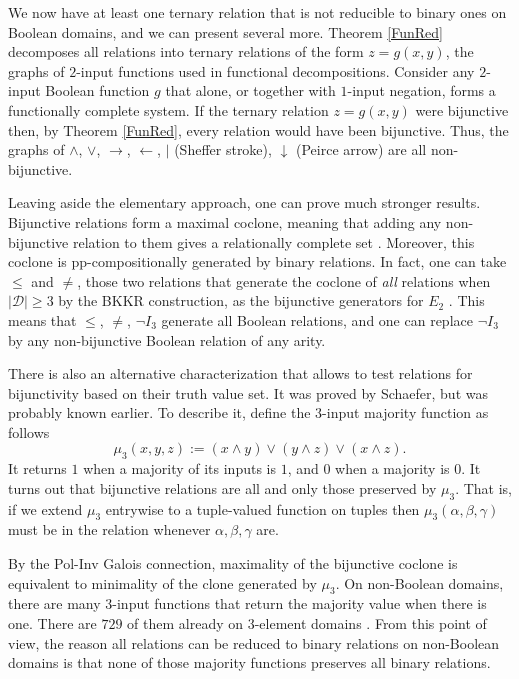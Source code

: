 \documentclass[11pt]{article}
\theoremstyle{plain}
\theoremstyle{definition}
\def\D{\mathcal{D}}
\def\a{\alpha}
\begin{document}
We now have at least one ternary relation that is not reducible to binary ones on Boolean domains, and we can present several more. Theorem \ref{FunRed} decomposes all relations into ternary relations of the form $z=g(x,y)$, the graphs of $2$-input functions used in functional decompositions. Consider any $2$-input Boolean function $g$ that alone, or together with $1$-input negation, forms a functionally complete system. If the ternary relation $z=g(x,y)$ were bijunctive then, by Theorem \ref{FunRed}, every relation would have been bijunctive. Thus, the graphs of $\land$, $\lor$, $\to$, $\leftarrow$, $|$ (Sheffer stroke), $\downarrow$ (Peirce arrow) are all non-bijunctive.

Leaving aside the elementary approach, one can prove much stronger results. Bijunctive relations form a maximal coclone, meaning that adding any non-bijunctive relation to them gives a relationally complete set \cite{BRSV05,CreVol08}. Moreover, this coclone is pp-compositionally generated by binary relations. In fact, one can take $\leq$ and $\neq$, those two relations that generate the coclone of {\it all} relations when $|\D|\geq3$ by the BKKR construction, as the bijunctive generators for $E_2$ \cite{BRSV05}. This means that $\leq$,  $\neq$, $\neg I_3$ generate all Boolean relations, and one can replace $\neg I_3$ by any non-bijunctive Boolean relation of any arity.

There is also an alternative characterization that allows to test relations for bijunctivity based on their truth value set. It was proved by Schaefer, but was probably known earlier. To describe it, define the $3$-input majority function as follows\begin{equation}\label{3Major}
\mu_3(x,y,z):=(x\land y)\lor(y\land z)\lor(x\land z).
\end{equation}
It returns $1$ when a majority of its inputs is $1$, and $0$ when a majority is $0$. It turns out that bijunctive relations are all and only those preserved by $\mu_3$. That is, if we extend $\mu_3$ entrywise to a tuple-valued function on tuples then $\mu_3(\a,\beta,\gamma)$ must be in the relation whenever $\a,\beta,\gamma$ are. 

By the Pol-Inv Galois connection, maximality of the bijunctive coclone is equivalent to minimality of the clone generated by $\mu_3$. On non-Boolean domains, there are many $3$-input functions that return the majority value when there is one. There are $729$ of them already on $3$-element domains \cite{Ros86}. From this point of view, the reason all relations can be reduced to binary relations on non-Boolean domains is that none of those majority functions preserves all binary relations. 
\end{document}
